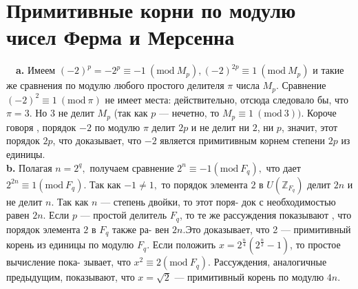 \documentclass{mai_book}
\begin{document}
\section{Примитивные корни по модулю чисел Ферма и Мерсенна}

\indent~~\textbf{a.} Имеем $(-2)^p=-2^p\equiv -1~(\text{mod}~M_p),(-2)^{2p}\equiv 1~(\text{mod}~M_p)$ и\linebreak
такие же сравнения по модулю любого простого делителя $\pi$ числа $M_p$. \linebreak
Сравнение $(-2)^2\equiv 1~(\text{mod}~\pi)$ не имеет места: действительно, отсюда\linebreak
следовало бы, что $\pi=3.$ Но 3 не делит $M_p$ (так как $p$ --- нечетно, то\linebreak
$M_p\equiv 1~(\text{mod}~3)).$ Короче говоря , порядок $-2$ по модулю $\pi$ делит $2p$ и \linebreak
\newpage
\noindent не делит ни $2$, ни $p$, значит, этот порядок $2p$, что доказывает, что $-2$\linebreak
является примитивным корнем степени $2p$ из единицы.\\
\indent\textbf{b.} Полагая $n=2^q,$ получаем сравнение $2^n\equiv -1 (\text{mod}~F_q),$ что дает\linebreak
$2^{2n}\equiv 1 (\text{mod}~F_q)$. Так как $-1\neq 1,$ то порядок элемента $2$ в $U(\mathbb{Z}_{F_q})$\linebreak
делит $2n$ и не делит $n$. Так как $n$ --- степень двойки, то этот поря-\linebreak
док с необходимостью равен $2n$. Если $p$ --- простой делитель $F_q$, то те\linebreak
же рассуждения показывают , что порядок элемента $2$ в $F_q$ также ра-\linebreak
вен $2n$.Это доказывает, что 2 --- примитивный корень из единицы по\linebreak
модулю $F_q$. Если положить $x=2^{\frac{n}{4}}(2^{\frac{n}{2}}-1)$, то простое вычисление пока-\linebreak
зывает, что $x^2\equiv 2 (\text{mod}~F_q).$ Рассуждения, аналогичные предыдущим, \linebreak
показывают, что $x=\sqrt{2}$ --- примитивный корень по модулю $4n$. 
\end{document}
